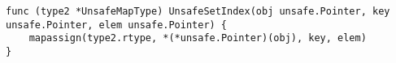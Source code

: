 \begin{lstlisting}[language=Golang, label=lst:labels-classexample-delegate, caption=Usage class example: delegate]
func (type2 *UnsafeMapType) UnsafeSetIndex(obj unsafe.Pointer, key unsafe.Pointer, elem unsafe.Pointer) {
    mapassign(type2.rtype, *(*unsafe.Pointer)(obj), key, elem)
}
\end{lstlisting}